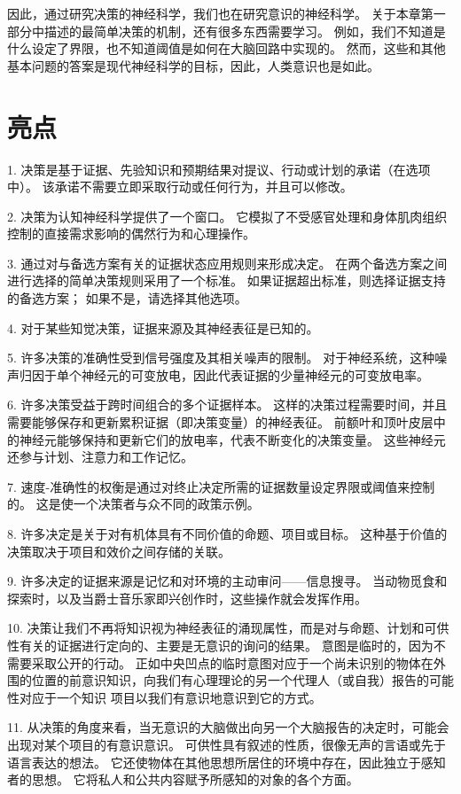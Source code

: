 因此，通过研究决策的神经科学，我们也在研究意识的神经科学。 关于本章第一部分中描述的最简单决策的机制，还有很多东西需要学习。 例如，我们不知道是什么设定了界限，也不知道阈值是如何在大脑回路中实现的。 然而，这些和其他基本问题的答案是现代神经科学的目标，因此，人类意识也是如此。



\section{亮点}

1. 决策是基于证据、先验知识和预期结果对提议、行动或计划的承诺（在选项中）。 该承诺不需要立即采取行动或任何行为，并且可以修改。 

2. 决策为认知神经科学提供了一个窗口。 它模拟了不受感官处理和身体肌肉组织控制的直接需求影响的偶然行为和心理操作。 

3. 通过对与备选方案有关的证据状态应用规则来形成决定。 在两个备选方案之间进行选择的简单决策规则采用了一个标准。 如果证据超出标准，则选择证据支持的备选方案； 如果不是，请选择其他选项。 

4. 对于某些知觉决策，证据来源及其神经表征是已知的。 

5. 许多决策的准确性受到信号强度及其相关噪声的限制。 对于神经系统，这种噪声归因于单个神经元的可变放电，因此代表证据的少量神经元的可变放电率。 

6. 许多决策受益于跨时间组合的多个证据样本。 这样的决策过程需要时间，并且需要能够保存和更新累积证据（即决策变量）的神经表征。 前额叶和顶叶皮层中的神经元能够保持和更新它们的放电率，代表不断变化的决策变量。 这些神经元还参与计划、注意力和工作记忆。 

7. 速度-准确性的权衡是通过对终止决定所需的证据数量设定界限或阈值来控制的。 这是使一个决策者与众不同的政策示例。 

8. 许多决定是关于对有机体具有不同价值的命题、项目或目标。 这种基于价值的决策取决于项目和效价之间存储的关联。 

9. 许多决定的证据来源是记忆和对环境的主动审问——信息搜寻。 当动物觅食和探索时，以及当爵士音乐家即兴创作时，这些操作就会发挥作用。 

10. 决策让我们不再将知识视为神经表征的涌现属性，而是对与命题、计划和可供性有关的证据进行定向的、主要是无意识的询问的结果。 意图是临时的，因为不需要采取公开的行动。 正如中央凹点的临时意图对应于一个尚未识别的物体在外围的位置的前意识知识，向我们有心理理论的另一个代理人（或自我）报告的可能性对应于一个知识 项目以我们有意识地意识到它的方式。 

11. 从决策的角度来看，当无意识的大脑做出向另一个大脑报告的决定时，可能会出现对某个项目的有意识意识。 可供性具有叙述的性质，很像无声的言语或先于语言表达的想法。 它还使物体在其他思想所居住的环境中存在，因此独立于感知者的思想。 它将私人和公共内容赋予所感知的对象的各个方面。

